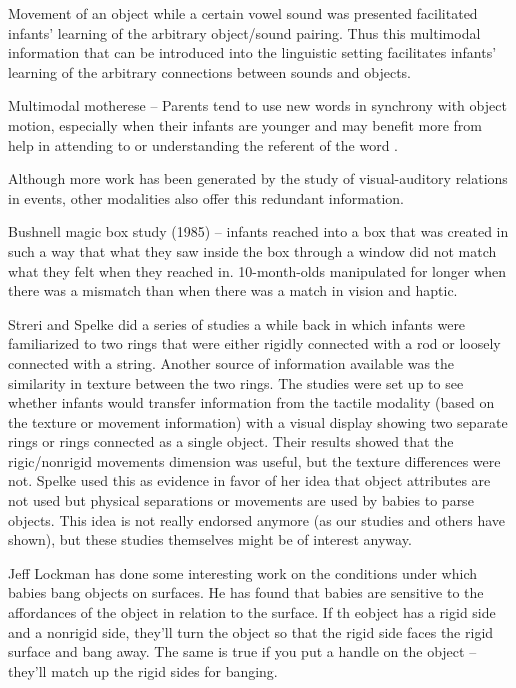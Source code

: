 Movement of an object while a certain vowel sound was presented
facilitated infants' learning of the arbitrary object/sound pairing.
Thus this multimodal information that can be introduced into the
linguistic setting facilitates infants' learning of the arbitrary
connections between sounds and objects.

Multimodal motherese -- Parents tend to use new words in synchrony
with object motion, especially when their infants are younger and may
benefit more from help in attending to or understanding the referent
of the word \cite{gogate00study}.



Although more work has been generated by the study of visual-auditory
relations in events, other modalities also offer this redundant
information.

Bushnell magic box study (1985) -- infants reached into a box
that was created in such a way that what they saw inside the box
through a window did not match what they felt when they reached in.
10-month-olds manipulated for longer when there was a mismatch than
when there was a match in vision and haptic.



\ifverbose

Streri and Spelke did a series of studies a while back in which
infants were familiarized to two rings that were either rigidly
connected with a rod or loosely connected with a string.  Another
source of information available was the similarity in texture between
the two rings.  The studies were set up to see whether infants would
transfer information from the tactile modality (based on the texture
or movement information) with a visual display showing two separate
rings or rings connected as a single object.  Their results showed
that the rigic/nonrigid movements dimension was useful, but the
texture differences were not. Spelke used this as evidence in favor of
her idea that object attributes are not used but physical separations
or movements are used by babies to parse objects.  This idea is not
really endorsed anymore (as our studies and others have shown), but
these studies themselves might be of interest anyway.



Jeff Lockman has done some interesting work on the conditions under
which babies bang objects on surfaces.  He has found that babies are
sensitive to the affordances of the object in relation to the surface.
If th eobject has a rigid side and a nonrigid side, they'll turn the
object so that the rigid side faces the rigid surface and bang away.
The same is true if you put a handle on the object -- they'll match up
the rigid sides for banging.

